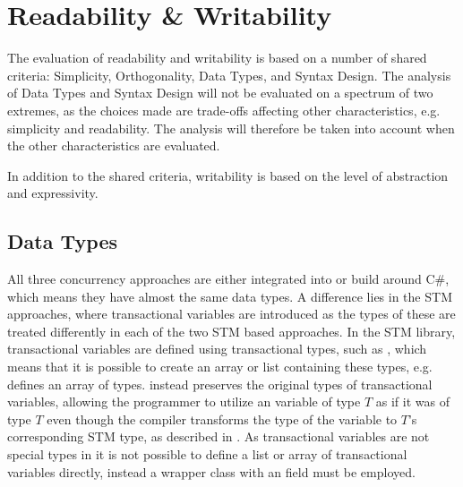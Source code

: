 \section{Readability \& Writability}\label{subsec:tl_charac_read_and_write}
The evaluation of readability and writability is based on a number of shared criteria: Simplicity, Orthogonality, Data Types, and Syntax Design. The analysis of Data Types and Syntax Design will not be evaluated on a spectrum of two extremes, as the choices made are trade-offs affecting other characteristics, e.g. simplicity and readability. The analysis will therefore be taken into account when the other characteristics are evaluated.

In addition to the shared criteria, writability is based on the level of abstraction and expressivity.
\subsection{Data Types}\label{subsec:datatypes}
All three concurrency approaches are either integrated into or build around C\#, which means they have almost the same data types. A difference lies in the \ac{STM} approaches, where transactional variables are introduced as the types of these are treated differently in each of the two \ac{STM} based approaches. In the \ac{STM} library, transactional variables are defined using transactional types, such as , which means that it is possible to create an array or list containing these types, e.g.  defines an array of  types. \stmname instead  preserves the original types of transactional variables, allowing the programmer to utilize an  variable of type $T$ as if it was of type $T$ even though the compiler transforms the type of the variable to $T$'s corresponding \ac{STM} type, as described in . As transactional variables are not special types in \stmname it is not possible to define a list or array of transactional variables directly, instead a wrapper class with an  field must be employed.

